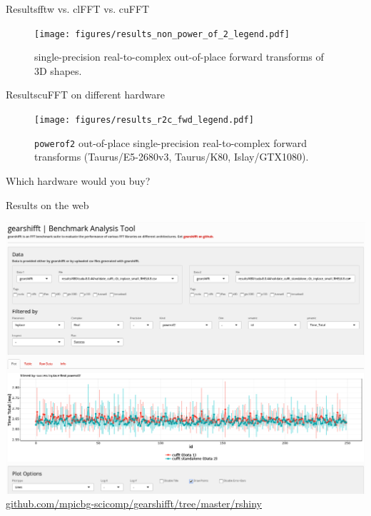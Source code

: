 \documentclass[t,11pt,hyperref={
  pdftitle = {gearshifft},
  pdfsubject = {gearshifft},
  pdfborder={0 0 0},
  colorlinks=true,
  urlcolor=red,
  citecolor=red,
  linkcolor=red,
  pdfauthor={Peter Steinbach, Matthias Werner}
  }
]{beamer}
\begin{document}
\begin{frame}{Results}{fftw vs. clFFT vs. cuFFT}
\begin{figure}[!tbp]
  \centering
  \texttt{[image: figures/results\_non\_power\_of\_2\_legend.pdf]}\\[-1em]
  \hfill
  \caption{single-precision real-to-complex out-of-place forward transforms of 3D shapes.}
  \label{fig:non_power_of_2}
\end{figure}
\end{frame}

\begin{frame}{Results}{cuFFT on different hardware}
\vfill
\begin{figure}[!tbp]
  \centering
  \texttt{[image: figures/results\_r2c\_fwd\_legend.pdf]}\vspace{-1em}
  \hfill
  \caption{\texttt{powerof2} out-of-place single-precision real-to-complex forward transforms (Taurus/E5-2680v3, Taurus/K80, Islay/GTX1080).}
  \label{fig:power_of_2}
\end{figure}
\vfill
\begin{center}
  \large
  Which hardware would you buy?
\end{center}
\vfill
\end{frame}


\begin{frame}{Results on the web}
  \begin{center}
    \includegraphics[width=.8\textwidth]{rshiny.png}\\[20pt]
    \href{https://github.com/mpicbg-scicomp/gearshifft/tree/master/rshiny}{github.com/mpicbg-scicomp/gearshifft/tree/master/rshiny}
  \end{center}

\end{frame}
\end{document}
